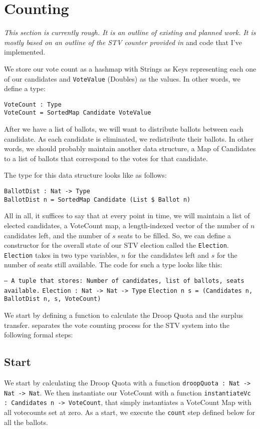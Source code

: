\section{Counting}

\textit{This section is currently rough. It is an outline of existing and
planned work. It is mostly based on an outline of the STV counter provided in}
\cite{stv_haskell} and code that I've implemented. 


We store our vote count as a hashmap with Strings as Keys representing each one
of our candidates and \texttt{VoteValue} (Doubles) as the values. In other
words, we define a type: 

\texttt{VoteCount : Type} \\
\texttt{VoteCount = SortedMap Candidate VoteValue}

After we have a list of ballots, we will want to distribute ballots between each
candidate. As each candidate is eliminated, we redistribute their ballots. In
other words, we should probably maintain another data structure, a Map of
Candidates to a list of ballots that correspond to the votes for that candidate.

The type for this data structure looks like as follows: 

\texttt{BallotDist : Nat -> Type} \\
\texttt{BallotDist n = SortedMap Candidate (List \$ Ballot n)}

All in all, it suffices to say that at every point in time, we will maintain a
list of elected candidates, a VoteCount map, a length-indexed vector of the
number of $n$ candidates left, and the number of $s$ seats to be filled. So, we
can define a constructor for the overall state of our STV election called the
\texttt{Election}. \texttt{Election} takes in two type variables, $n$ for the
candidates left and $s$ for the number of seats still available. The code for
such a type looks like this: 

\texttt{-- A tuple that stores: Number of candidates, list of ballots, seats available.}
\texttt{Election : Nat -> Nat -> Type}
\texttt{Election n s = (Candidates n, BallotDist n, s, VoteCount)}

We start by defining a function to calculate the Droop Quota and the surplus
transfer. \cite{stv_haskell} separates the vote counting process for the STV
system into the following formal steps: 

\subsection{Start}
We start by calculating the Droop Quota with a function \texttt{droopQuota : Nat
-> Nat -> Nat}. We then instantiate our VoteCount with a function
\texttt{instantiateVc : Candidates n -> VoteCount}, that simply instantiates a
VoteCount Map with all votecounts set at zero. As a start, we execute the
\texttt{count} step defined below for all the ballots. 

